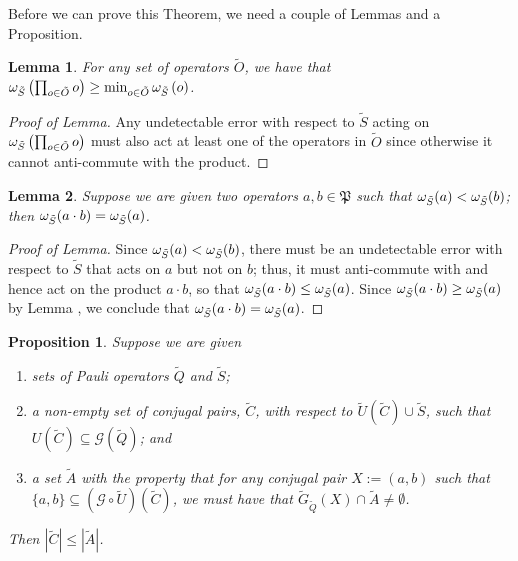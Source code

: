 \documentclass[twocolumn,showpacs,preprintnumbers,amsmath,amssymb,nofootinbib,pra,floatfix]{revtex4-1}
\newtheorem{proposition}{Proposition}
\newtheorem{lemma}{Lemma}
\newcommand{\set}{\tilde}
\newcommand{\genfun}{\mathcal{G}}
\newcommand{\pauligroup}{\mathfrak{P}}
\begin{document}
Before we can prove this Theorem, we need a couple of Lemmas and a Proposition.
\begin{lemma}
\label{combinations-can't-make-things-worse}
For any set of operators $\set O$, we have that $\om_{\set S}\paren{\prod_{o\in\set O} o} \ge \text{min}_{o\in \set O}\,\om_{\set S}\paren{o}$.
\end{lemma}

\begin{proof}[Proof of Lemma]
Any undetectable error with respect to $\set S$ acting on $\om_{\set S}\paren{\prod_{o\in\set O} o}$ must also act at least one of the operators in $\set O$ since otherwise it cannot anti-commute with the product. \end{proof}
\begin{lemma}
\label{lesser-operator-wins}
Suppose we are given two operators $a,b\in\pauligroup$ such that $\om_{\set S}(a)<\om_{\set S}(b)$;  then $\om_{\set S}(a\cdot b) = \om_{\set S}(a)$.
\end{lemma}

\begin{proof}[Proof of Lemma]
Since $\om_{\set S}(a)<\om_{\set S}(b)$, there must be an undetectable error with respect to $\set S$ that acts on $a$ but not on $b$;  thus, it must anti-commute with and hence act on the product $a\cdot b$, so that $\om_{\set S}(a\cdot b)\le \om_{\set S}(a)$.  Since $\om_{\set S}(a\cdot b)\ge \om_{\set S}(a)$ by Lemma , we conclude that $\om_{\set S}(a\cdot b) = \om_{\set S}(a)$.
\end{proof}
\begin{proposition}
\label{bound-on-recombinations}
Suppose we are given
\begin{enumerate}
\item sets of Pauli operators $\set Q$ and $\set S$;
\item a non-empty set of conjugal pairs, $\set C$, with respect to $\set U(\set C) \cup \set S$, such that $U(\set C)\subseteq \genfun(\set Q)$; and \item a set $\set A$ with the property that for any conjugal pair $X:=(a,b)$ such that $\{a,b\}\subseteq(\genfun\circ\set U)(\set C)$, we must have that $\set G_{\set Q}(X) \cap \set A \ne \emptyset$.
\end{enumerate}
Then $|\set C|\le|\set A|$.
\end{proposition}
\end{document}
